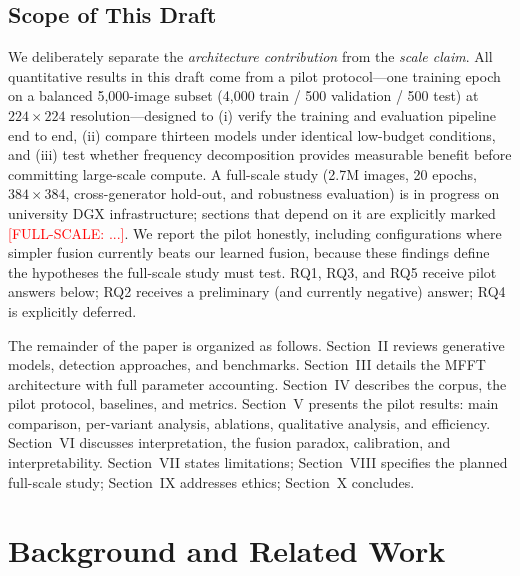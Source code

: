 \documentclass[journal]{IEEEtran}
\newcommand{\fullscale}[1]{\textcolor{red}{[FULL-SCALE: #1]}}
\begin{document}
\subsection{Scope of This Draft}
We deliberately separate the \emph{architecture contribution} from the \emph{scale claim}. All quantitative results in this draft come from a pilot protocol---one training epoch on a balanced 5,000-image subset (4,000 train / 500 validation / 500 test) at $224\times224$ resolution---designed to (i) verify the training and evaluation pipeline end to end, (ii) compare thirteen models under identical low-budget conditions, and (iii) test whether frequency decomposition provides measurable benefit before committing large-scale compute. A full-scale study (2.7M images, 20 epochs, $384\times384$, cross-generator hold-out, and robustness evaluation) is in progress on university DGX infrastructure; sections that depend on it are explicitly marked \fullscale{...}. We report the pilot honestly, including configurations where simpler fusion currently beats our learned fusion, because these findings define the hypotheses the full-scale study must test. RQ1, RQ3, and RQ5 receive pilot answers below; RQ2 receives a preliminary (and currently negative) answer; RQ4 is explicitly deferred.

The remainder of the paper is organized as follows. Section~II reviews generative models, detection approaches, and benchmarks. Section~III details the MFFT architecture with full parameter accounting. Section~IV describes the corpus, the pilot protocol, baselines, and metrics. Section~V presents the pilot results: main comparison, per-variant analysis, ablations, qualitative analysis, and efficiency. Section~VI discusses interpretation, the fusion paradox, calibration, and interpretability. Section~VII states limitations; Section~VIII specifies the planned full-scale study; Section~IX addresses ethics; Section~X concludes.

\section{Background and Related Work}
\end{document}
